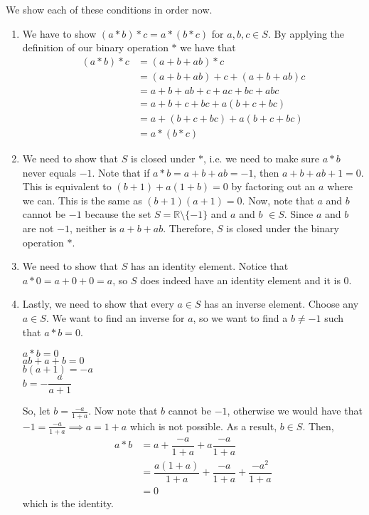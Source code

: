 \documentclass{article}
\begin{document}
\noindent
We show each of these conditions in order now.
\begin{enumerate}
	\item We have to show $(a * b) * c = a * (b * c)$ for $a, b, c \in S$. By applying the definition of our binary operation $*$ we have that
	\begin{align*}
		(a * b) * c &= (a + b + ab) * c	\\
		&= (a + b + ab) + c + (a + b + ab) c \\
		&= a + b + ab + c + ac + bc + abc \\
		&= a + b + c + bc + a(b + c + bc) \\
		&= a + (b + c + bc) + a(b + c + bc) \\		
		&= a * (b * c)
	\end{align*}
	\item We need to show that $S$ is closed under $*$, i.e. we need to make sure $a * b$ never equals $-1$.  Note that if $a * b = a + b + ab = -1$, then $a + b + ab + 1 = 0$.  This is equivalent to $(b + 1) + a(1 + b) = 0$ by factoring out an $a$ where we can. This is the same as $(b+1)(a+1) = 0$. Now, note that $a$ and $b$ cannot be $-1$ because the set $S = \mathbb{R} \setminus \{-1\}$ and $a$ and $b$ $\in S$. Since $a$ and $b$ are not $-1$, neither is $a + b + ab$. Therefore, $S$ is closed under the binary operation $*$.
	\item We need to show that $S$ has an identity element. Notice that $a * 0 = a + 0 + 0 = a$, so $S$ does indeed have an identity element and it is $0$.
	\item Lastly, we need to show that every $a \in S$ has an inverse element. Choose any $a \in S$. We want to find an inverse for $a$, so we want to find a $b \neq -1$ such that $a * b = 0$.  	
	\begin{center}
		$ a * b = 0$ \\
		$ ab + a + b = 0$ \\
		$ b(a + 1) = -a$ \\
		$ b = -\dfrac{a}{a+1} $
	\end{center}	
\noindent
So, let $b = \frac{-a}{1+a}$. Now note that $b$ cannot be $-1$, otherwise we would have that $-1 = \frac{-a}{1+a} \implies a = 1 + a$ which is not possible. As a result, $b \in S$. Then, 
	\begin{align*}
		a * b &= a + \dfrac{-a}{1+a} + a\dfrac{-a}{1+a} \\
		&= \dfrac{a(1+a)}{1+a} + \dfrac{-a}{1+a} + \dfrac{-a^{2}}{1+a} \\
		&= 0
	\end{align*}
which is the identity.
\end{enumerate}
\end{document}
